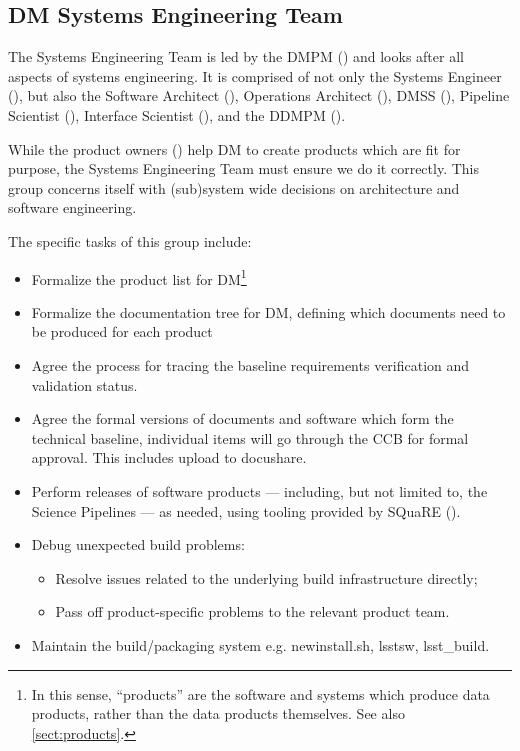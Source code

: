 \subsection{DM Systems Engineering Team \label{sect:sysengt}}

The Systems Engineering Team is led by the DMPM () and looks after all aspects of systems engineering.
It is comprised of not only the Systems Engineer (), but also the Software Architect (), Operations Architect (), \gls{DMSS} (), Pipeline Scientist (), Interface Scientist (), and the \gls{DDMPM} ().

While the product owners () help DM to create products which are fit for purpose, the Systems Engineering Team must ensure we do it correctly. This group concerns itself with (sub)system wide decisions on architecture and software engineering.

The specific tasks of this group include:

\begin{itemize}
\item Formalize the product list for DM\footnote{In this sense, ``products'' are the software and systems which produce data products, rather than the data products themselves. See also \ref{sect:products}.}
\item Formalize the documentation tree for DM, defining which documents need to be produced for each product
\item Agree the process for tracing the baseline requirements verification and validation status.
\item Agree the formal versions of documents and software which form the technical baseline, individual items will go through the CCB for formal approval.  This includes upload to docushare.
\item Perform releases of software products --- including, but not limited to, the Science Pipelines --- as needed, using tooling provided by SQuaRE ().
\item Debug unexpected build problems:
\begin{itemize}
  \item{Resolve issues related to the underlying build infrastructure directly;}
  \item{Pass off product-specific problems to the relevant product team.}
\end{itemize}
\item Maintain the build/packaging system e.g.  newinstall.sh, lsstsw, lsst\_build.
\end{itemize}

